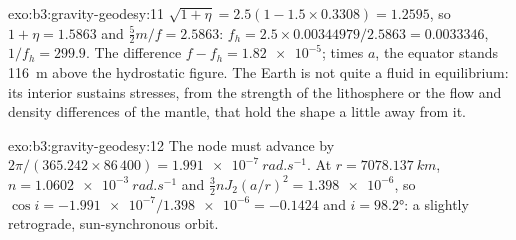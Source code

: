 \begin{solution}{exo:b3:gravity-geodesy:11}
$\sqrt{1 + \eta} = 2.5(1 - 1.5\times0.3308) = 1.2595$, so $1 + \eta = 1.5863$
and $\tfrac52m/f = 2.5863$: $f_h = 2.5\times0.00344979/2.5863 = \num{0.0033346}$,
$1/f_h = 299.9$. The difference $f - f_h = \num{1.82e-5}$; times $a$, the
equator stands \qty{116}{m} above the hydrostatic figure. The Earth is not quite
a fluid in equilibrium: its interior sustains stresses, from the strength of
the lithosphere or the flow and density differences of the mantle, that hold
the shape a little away from it.
\end{solution}

\begin{solution}{exo:b3:gravity-geodesy:12}
The node must advance by $2\pi/(365.242\times86\,400) =
\qty{1.991e-7}{rad.s^{-1}}$. At $r = \qty{7078.137}{km}$, $n =
\qty{1.0602e-3}{rad.s^{-1}}$ and $\tfrac32nJ_2(a/r)^2 = \num{1.398e-6}$, so
$\cos i = -\num{1.991e-7}/\num{1.398e-6} = -0.1424$ and $i = \ang{98.2}$: a
slightly retrograde, sun-synchronous orbit.
\end{solution}


